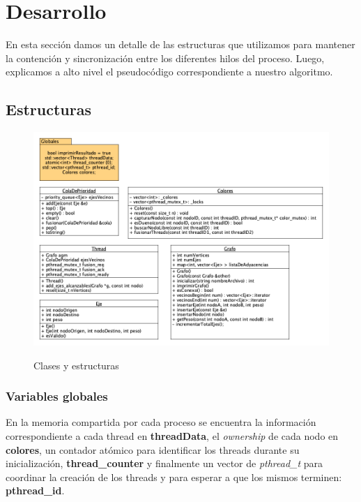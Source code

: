 \section{Desarrollo}

En esta sección damos un detalle de las estructuras que utilizamos para mantener la contención y sincronización entre los diferentes hilos del proceso. Luego, explicamos a alto nivel el pseudocódigo correspondiente a nuestro algoritmo.

\subsection{Estructuras}

\begin{figure}[h]
    \centering
    \includegraphics[width=1\textwidth]{imagenes/tp1.png} \\%
    \caption{Clases y estructuras}
    \label{fig:uml}
\end{figure}

\subsubsection{Variables globales}

En la memoria compartida por cada proceso se encuentra la información correspondiente a cada thread en \textbf{threadData}, el \textit{ownership} de cada nodo en \textbf{colores}, un contador atómico para identificar los threads durante su inicialización, \textbf{thread_counter} y finalmente un vector de \textit{pthread_t} para coordinar la creación de los threads y para esperar a que los mismos terminen: \textbf{pthread_id}.

